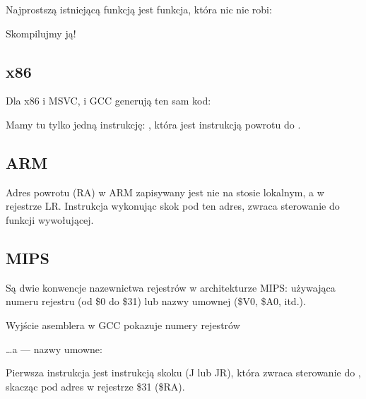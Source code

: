 \label{empty_func}

Najprostszą istniejącą funkcją jest funkcja, która nic nie robi:



Skompilujmy ją!

\subsection{x86}

Dla x86 i MSVC, i GCC generują ten sam kod:



Mamy tu tylko jedną instrukcję: \RET, która jest instrukcją powrotu do .

\subsection{ARM}



Adres powrotu (\ac{RA}) w ARM zapisywany jest nie na stosie lokalnym, a w rejestrze \ac{LR}.
Instrukcja  wykonując skok pod ten adres, zwraca sterowanie do funkcji wywołującej.

\subsection{MIPS}

Są dwie konwencje nazewnictwa rejestrów w architekturze MIPS:
używająca numeru rejestru (od \$0 do \$31) lub nazwy umownej (\$V0, \$A0, itd.).

Wyjście asemblera w GCC pokazuje numery rejestrów



\dots a \IDA --- nazwy umowne:




Pierwsza instrukcja jest instrukcją skoku (J lub JR),
która zwraca sterowanie do , skacząc pod adres w rejestrze \$31 (\$RA).


